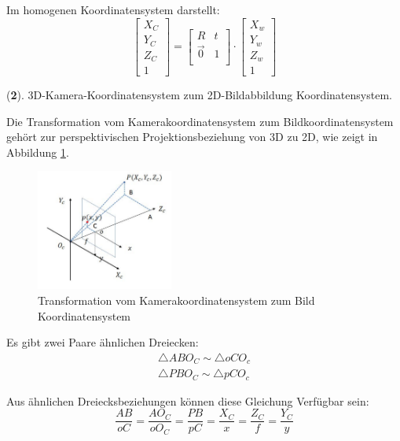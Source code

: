 Im homogenen Koordinatensystem darstellt:
\begin{equation}
   \begin{bmatrix}
	X_C \\  
	Y_C \\
	Z_C \\
	1
	\end{bmatrix} = \begin{bmatrix}
	R & t	\\
	\vec{0}	& 1 \\
	\end{bmatrix} \cdot \begin{bmatrix}
	X_w \\  
	Y_w \\
	Z_w \\
	1
	\end{bmatrix}
\end{equation}

(\textbf{2}). 3D-Kamera-Koordinatensystem zum 2D-Bildabbildung Koordinatensystem.

Die Transformation vom Kamerakoordinatensystem zum Bildkoordinatensystem gehört zur perspektivischen Projektionsbeziehung von 3D zu 2D, wie zeigt in Abbildung \ref{fig:Czuimage}.

\begin{figure}[H]
 \centering 
 \includegraphics[keepaspectratio,width=0.4\textwidth]{images/4_ZweiteErfahrung/Kamera/Czuimage.pdf}
 \caption{Transformation vom Kamerakoordinatensystem zum Bild Koordinatensystem}
 \label{fig:Czuimage}
\end{figure} 

Es gibt zwei Paare ähnlichen Dreiecken:
\begin{equation}
   \begin{split}
    \triangle ABO_C \sim \triangle oCO_c\\  
	\triangle PBO_C \sim \triangle pCO_c
	\end{split}
\end{equation}

Aus ähnlichen Dreiecksbeziehungen können diese Gleichung Verfügbar sein:
\begin{equation}
   \frac{AB}{oC} = \frac{AO_C}{oO_C} = \frac{PB}{pC} = \frac{X_C}{x} = \frac{Z_C}{f} = \frac{Y_C}{y} 
\end{equation}

